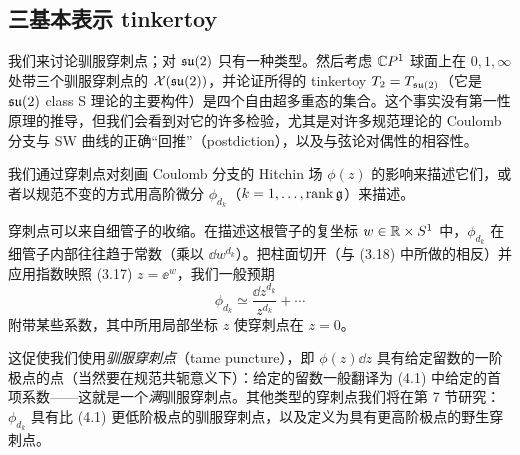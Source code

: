 
\subsection{三基本表示 tinkertoy}

我们来讨论驯服穿刺点；对 $\mathfrak{su}(2)$ 只有一种类型。然后考虑 $\mathbb{C} P^1$ 球面上在 $0,1,\infty$ 处带三个驯服穿刺点的 $\mathcal{X}(\mathfrak{su}(2))$，并论证所得的 tinkertoy $T_2=T_{\mathfrak{su}(2)}$（它是 $\mathfrak{su}(2)$ class S 理论的主要构件）是四个自由超多重态的集合。这个事实没有第一性原理的推导，但我们会看到对它的许多检验，尤其是对许多规范理论的 Coulomb 分支与 SW 曲线的正确“回推”（postdiction），以及与弦论对偶性的相容性。


 我们通过穿刺点对刻画 Coulomb 分支的 Hitchin 场 $\phi(z)$ 的影响来描述它们，或者以规范不变的方式用高阶微分 $\phi_{d_k}$（$k=1,\dots,\operatorname{rank}\mathfrak{g}$）来描述。

穿刺点可以来自细管子的收缩。在描述这根管子的复坐标 $w\in\mathbb{R}\times S^1$ 中，$\phi_{d_k}$ 在细管子内部往往趋于常数（乘以 $\dd w^{d_k}$）。把柱面切开（与 (3.18) 中所做的相反）并应用指数映照 (3.17) $z=\ee^{w}$，我们一般预期
\begin{equation}
  \phi_{d_k}\simeq\frac{\dd z^{d_k}}{z^{d_k}}+\cdots
  \tag{4.1}
\end{equation}
附带某些系数，其中所用局部坐标 $z$ 使穿刺点在 $z=0$。


这促使我们使用\textit{驯服穿刺点}（tame puncture），即 $\phi(z)\dd z$ 具有给定留数的一阶极点的点（当然要在规范共轭意义下）：给定的留数一般翻译为 (4.1) 中给定的首项系数------这就是一个\textit{满}驯服穿刺点。其他类型的穿刺点我们将在第 7 节研究：$\phi_{d_k}$ 具有比 (4.1) 更低阶极点的驯服穿刺点，以及定义为具有更高阶极点的野生穿刺点。

